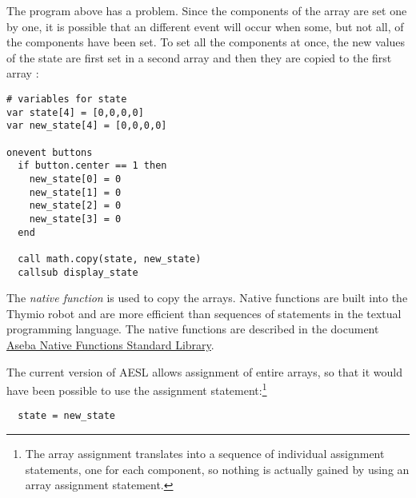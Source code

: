 The program above has a problem. Since the components of the array
 are set one by one, it is possible that an different event
will occur when some, but not all, of the components have been set. To
set all the components at once, the new values of the state are first
set in a second array  and then they are copied to the
first array :

\begin{footnotesize}
\begin{verbatim}
# variables for state
var state[4] = [0,0,0,0]
var new_state[4] = [0,0,0,0]

onevent buttons
  if button.center == 1 then
    new_state[0] = 0
    new_state[1] = 0
    new_state[2] = 0
    new_state[3] = 0
  end

  call math.copy(state, new_state)
  callsub display_state
\end{verbatim}
\end{footnotesize}

The \emph{native function}  is used to copy the arrays.
Native functions are built into the Thymio robot and are more efficient
than sequences of statements in the textual programming language. The
native functions are described in the document
\href{https://aseba.wikidot.com/en:asebastdnative}%
{Aseba Native Functions Standard Library}.

The current version of AESL allows assignment of entire arrays, so that
it would have been possible to use the assignment
statement:\footnote{The array assignment translates into a sequence of
individual assignment statements, one for each component, so nothing is
actually gained by using an array assignment statement.}

\begin{footnotesize}
\begin{verbatim}
  state = new_state
\end{verbatim}
\end{footnotesize}
